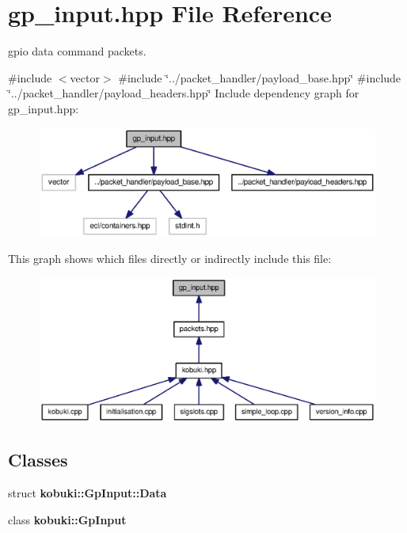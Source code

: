 \section{gp\-\_\-input.\-hpp \-File \-Reference}
\label{gp__input_8hpp}


gpio data command packets.  


{\ttfamily \#include $<$vector$>$}\*
{\ttfamily \#include \char`\"{}../packet\-\_\-handler/payload\-\_\-base.\-hpp\char`\"{}}\*
{\ttfamily \#include \char`\"{}../packet\-\_\-handler/payload\-\_\-headers.\-hpp\char`\"{}}\*
\-Include dependency graph for gp\-\_\-input.\-hpp\-:
\nopagebreak
\begin{figure}[H]
\begin{center}
\leavevmode
\includegraphics[width=350pt]{gp__input_8hpp__incl}
\end{center}
\end{figure}
\-This graph shows which files directly or indirectly include this file\-:
\nopagebreak
\begin{figure}[H]
\begin{center}
\leavevmode
\includegraphics[width=350pt]{gp__input_8hpp__dep__incl}
\end{center}
\end{figure}
\subsection*{\-Classes}
\begin{DoxyCompactItemize}
\item 
struct {\bf kobuki\-::\-Gp\-Input\-::\-Data}
\item 
class {\bf kobuki\-::\-Gp\-Input}
\end{DoxyCompactItemize}
